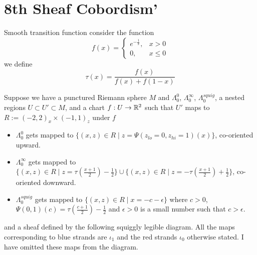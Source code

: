 \section{8th Sheaf Cobordism'}
\begin{definition}
Smooth transition function consider the function
\[
f(x) =
\begin{cases}
e^{-\frac{1}{x}}, & x > 0 \\
0, & x \leq 0
\end{cases}
\]
we define 
\[
\tau(x) = \frac{f(x)}{f(x)+f(1-x)}
\]
\end{definition}
Suppose we have a punctured Riemann sphere $M$ and $\Lambda_0^0$, $\Lambda_0^\infty$, $\Lambda_0^{squig}$, a nested regions $U\subset U' \subset M$, and a chart $f : U \rightarrow \mathbb{R}^2$ such that $U'$ maps to $R:=(-2,2)_x \times (-1,1)_z$ under $f$
\begin{itemize}
\item $\Lambda_0^0$ gets mapped to $\{(x,z)\in R \mid z=\Psi(z_{lo} = 0,z_{hi}=1)(x)\}$, co-oriented upward.

\item $\Lambda_0^\infty$ gets mapped to $\{(x,z)\in R \mid z=\tau(\frac{x+1}{2})-\frac{1}{2}\}\cup \{(x,z)\in R \mid z=-\tau(\frac{x+1}{2})+\frac{1}{2}\}$, co-oriented downward.

\item $\Lambda_0^{squig}$ gets mapped to $\{(x,z)\in R \mid x = -c-\epsilon\}$ where $c>0$, $\Psi(0,1)(c) = \tau(\frac{c+1}{2})-\frac{1}{2}$ and $\epsilon >0$ is a small number such that $c>\epsilon$.
\end{itemize}
and a sheaf defined by the following squiggly legible diagram. All the maps corresponding to blue strands are $\iota_1$ and the red strands $\iota_0$ otherwise stated. I have omitted these maps from the diagram.\\

